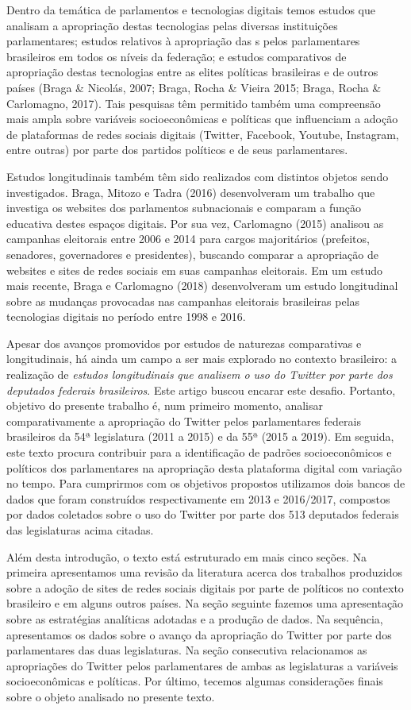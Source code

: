 Dentro da temática de parlamentos e tecnologias digitais temos estudos
que analisam a apropriação destas tecnologias pelas diversas
instituições parlamentares; estudos relativos à apropriação das s
pelos parlamentares brasileiros em todos os níveis da federação; e
estudos comparativos de apropriação destas tecnologias entre as elites
políticas brasileiras e de outros países (Braga \& Nicolás, 2007; Braga,
Rocha \& Vieira 2015; Braga, Rocha \& Carlomagno, 2017). Tais pesquisas
têm permitido também uma compreensão mais ampla sobre variáveis
socioeconômicas e políticas que influenciam a adoção de plataformas de
redes sociais digitais (Twitter, Facebook, Youtube, Instagram, entre
outras) por parte dos partidos políticos e de seus parlamentares.

Estudos longitudinais também têm sido realizados com distintos objetos
sendo investigados. Braga, Mitozo e Tadra (2016) desenvolveram um
trabalho que investiga os websites dos parlamentos subnacionais e
comparam a função educativa destes espaços digitais. Por sua vez,
Carlomagno (2015) analisou as campanhas eleitorais entre 2006 e 2014
para cargos majoritários (prefeitos, senadores, governadores e
presidentes), buscando comparar a apropriação de websites e sites de
redes sociais em suas campanhas eleitorais. Em um estudo mais recente,
Braga e Carlomagno (2018) desenvolveram um estudo longitudinal sobre as
mudanças provocadas nas campanhas eleitorais brasileiras pelas
tecnologias digitais no período entre 1998 e 2016.

Apesar dos avanços promovidos por estudos de naturezas comparativas e
longitudinais, há ainda um campo a ser mais explorado no contexto
brasileiro: a realização de \emph{estudos longitudinais} \emph{que
analisem o uso do Twitter por parte dos deputados federais brasileiros}.
Este artigo buscou encarar este desafio. Portanto, objetivo do presente
trabalho é, num primeiro momento, analisar comparativamente a
apropriação do Twitter pelos parlamentares federais brasileiros da 54ª
legislatura (2011 a 2015) e da 55ª (2015 a 2019). Em seguida, este texto
procura contribuir para a identificação de padrões socioeconômicos e
políticos dos parlamentares na apropriação desta plataforma digital com
variação no tempo. Para cumprirmos com os objetivos propostos utilizamos
dois bancos de dados que foram construídos respectivamente em 2013 e
2016/2017, compostos por dados coletados sobre o uso do Twitter por
parte dos 513 deputados federais das legislaturas acima citadas.

Além desta introdução, o texto está estruturado em mais cinco seções. Na
primeira apresentamos uma revisão da literatura acerca dos trabalhos
produzidos sobre a adoção de sites de redes sociais digitais por parte
de políticos no contexto brasileiro e em alguns outros países. Na seção
seguinte fazemos uma apresentação sobre as estratégias analíticas
adotadas e a produção de dados. Na sequência, apresentamos os dados
sobre o avanço da apropriação do Twitter por parte dos parlamentares das
duas legislaturas. Na seção consecutiva relacionamos as apropriações do
Twitter pelos parlamentares de ambas as legislaturas a variáveis
socioeconômicas e políticas. Por último, tecemos algumas considerações
finais sobre o objeto analisado no presente texto.

